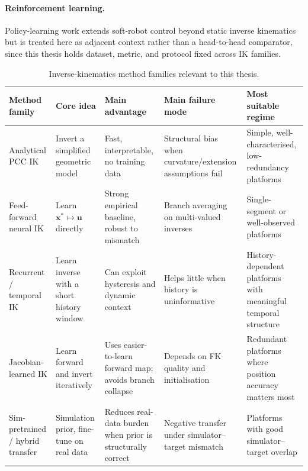 \paragraph{Reinforcement learning.}
Policy-learning work \cite{thuruthel2019modelbased} extends soft-robot control beyond static inverse kinematics but is treated here as adjacent context rather than a head-to-head comparator, since this thesis holds dataset, metric, and protocol fixed across IK families.

\begin{table}[ht]
\centering
\caption[Inverse-kinematics method families relevant to this thesis.]{Inverse-kinematics method families relevant to this thesis.}
\label{tab:bg_methods}
\begin{tabularx}{\linewidth}{@{}l X X X X@{}}
\toprule
Method family                    & Core idea                                       & Main advantage                                             & Main failure mode                                         & Most suitable regime \\
\midrule
Analytical PCC IK                & Invert a simplified geometric model              & Fast, interpretable, no training data                      & Structural bias when curvature/extension assumptions fail  & Simple, well-characterised, low-redundancy platforms \\
Feed-forward neural IK           & Learn $\mathbf{x}^{\ast} \mapsto \mathbf{u}$ directly & Strong empirical baseline, robust to mismatch           & Branch averaging on multi-valued inverses                 & Single-segment or well-observed platforms \\
Recurrent / temporal IK          & Learn inverse with a short history window        & Can exploit hysteresis and dynamic context                 & Helps little when history is uninformative                & History-dependent platforms with meaningful temporal structure \\
Jacobian-learned IK              & Learn forward and invert iteratively             & Uses easier-to-learn forward map; avoids branch collapse   & Depends on FK quality and initialisation                   & Redundant platforms where position accuracy matters most \\
Sim-pretrained / hybrid transfer & Simulation prior, fine-tune on real data         & Reduces real-data burden when prior is structurally correct & Negative transfer under simulator--target mismatch        & Platforms with good simulator--target overlap \\
\bottomrule
\end{tabularx}
\end{table}


